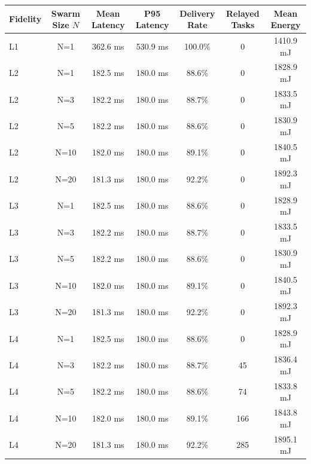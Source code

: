 \begin{tabular}{@{}lcccccc@{}}
\toprule
\textbf{Fidelity} & \textbf{Swarm Size $N$} & \textbf{Mean Latency} & \textbf{P95 Latency} & \textbf{Delivery Rate} & \textbf{Relayed Tasks} & \textbf{Mean Energy} \\ \midrule
L1 & N=1 & 362.6 ms & 530.9 ms & 100.0\% & 0 & 1410.9 mJ \\
L2 & N=1 & 182.5 ms & 180.0 ms & 88.6\% & 0 & 1828.9 mJ \\
L2 & N=3 & 182.2 ms & 180.0 ms & 88.7\% & 0 & 1833.5 mJ \\
L2 & N=5 & 182.2 ms & 180.0 ms & 88.6\% & 0 & 1830.9 mJ \\
L2 & N=10 & 182.0 ms & 180.0 ms & 89.1\% & 0 & 1840.5 mJ \\
L2 & N=20 & 181.3 ms & 180.0 ms & 92.2\% & 0 & 1892.3 mJ \\
L3 & N=1 & 182.5 ms & 180.0 ms & 88.6\% & 0 & 1828.9 mJ \\
L3 & N=3 & 182.2 ms & 180.0 ms & 88.7\% & 0 & 1833.5 mJ \\
L3 & N=5 & 182.2 ms & 180.0 ms & 88.6\% & 0 & 1830.9 mJ \\
L3 & N=10 & 182.0 ms & 180.0 ms & 89.1\% & 0 & 1840.5 mJ \\
L3 & N=20 & 181.3 ms & 180.0 ms & 92.2\% & 0 & 1892.3 mJ \\
L4 & N=1 & 182.5 ms & 180.0 ms & 88.6\% & 0 & 1828.9 mJ \\
L4 & N=3 & 182.2 ms & 180.0 ms & 88.7\% & 45 & 1836.4 mJ \\
L4 & N=5 & 182.2 ms & 180.0 ms & 88.6\% & 74 & 1833.8 mJ \\
L4 & N=10 & 182.0 ms & 180.0 ms & 89.1\% & 166 & 1843.8 mJ \\
L4 & N=20 & 181.3 ms & 180.0 ms & 92.2\% & 285 & 1895.1 mJ \\
\bottomrule
\end{tabular}
